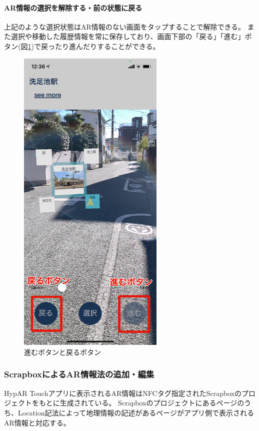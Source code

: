 \paragraph*{AR情報の選択を解除する・前の状態に戻る}
上記のような選択状態はAR情報のない画面をタップすることで解除できる。
また選択や移動した履歴情報を常に保存しており、画面下部の「戻る」「進む」ボタン(図\ref{fig:hypar_touch_history_button})で戻ったり進んだりすることができる。

\begin{figure}[htbp]
  \centering
  \includegraphics[width=70mm]{images/hypar_touch_history_button.png}
  \caption{進むボタンと戻るボタン} \label{fig:hypar_touch_history_button}
\end{figure}

\subsubsection{ScrapboxによるAR情報法の追加・編集}
HypAR Touchアプリに表示されるAR情報はNFCタグ指定されたScrapboxのプロジェクトをもとに生成されている。
Scrapboxのプロジェクトにあるページのうち、Location記法によって地理情報の記述があるページがアプリ側で表示されるAR情報と対応する。

